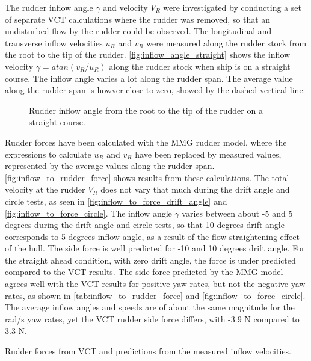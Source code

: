 The rudder inflow angle $\gamma$ and velocity $V_R$ were investigated by conducting a set of separate VCT calculations where the rudder was removed, so that an undisturbed flow by the rudder could be observed. The longitudinal and transverse inflow velocities $u_R$ and $v_R$ were measured along the rudder stock from the root to the tip of the rudder. \autoref{fig:inflow_angle_straight} shows the inflow velocity $\gamma=atan(v_R/u_R)$ along the rudder stock when ship is on a straight course. The inflow angle varies a lot along the rudder span. The average value along the rudder span is howver close to zero, showed by the dashed vertical line.
\begin{figure}[h]
    \centering 
    
    \caption{Rudder inflow angle from the root to the tip of the rudder on a straight course.}
     \label{fig:inflow_angle_straight}
\end{figure}
Rudder forces have been calculated with the MMG rudder model, where the expressions to calculate $u_R$ and $v_R$ have been replaced by measured values, represented by the average values along the rudder span. 
\autoref{fig:inflow_to_rudder_force} shows results from these calculations. The total velocity at the rudder $V_R$ does not vary that much during the drift angle and circle tests, as seen in \autoref{fig:inflow_to_force_drift_angle} and \autoref{fig:inflow_to_force_circle}. The inflow angle $\gamma$ varies between about -5 and 5 degrees during the drift angle and circle tests, so that 10 degrees drift angle corresponds to 5 degrees inflow angle, as a result of the flow straightening effect of the hull. 
The side force is well predicted for -10 and 10 degrees drift angle. For the straight ahead condition, with zero drift angle, the force is under predicted compared to the VCT results. 
The side force predicted by the MMG model agrees well with the VCT results for positive yaw rates, but not the negative yaw rates, as shown in \autoref{tab:inflow_to_rudder_force} and \autoref{fig:inflow_to_force_circle}. The average inflow angles and speeds are of about the same magnitude for the  rad/s yaw rates, yet the VCT rudder side force differs, with -3.9 N compared to 3.3 N. 
\begin{table}[h]
    \centering
    \caption{Rudder forces from VCT and predictions from the measured inflow velocities.}
    \label{tab:inflow_to_rudder_force}
\end{table}
